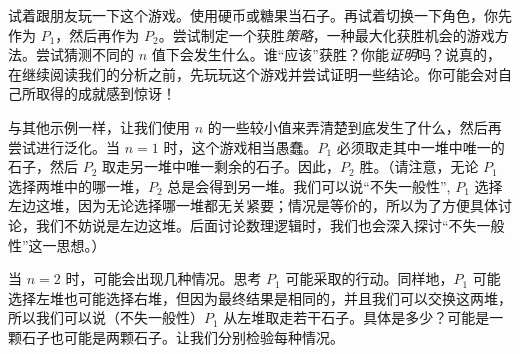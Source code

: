 试着跟朋友玩一下这个游戏。使用硬币或糖果当石子。再试着切换一下角色，你先作为 $P_1$，然后再作为 $P_2$。尝试制定一个获胜\textit{策略}，一种最大化获胜机会的游戏方法。尝试猜测不同的 $n$ 值下会发生什么。谁``应该''获胜？你能\textit{证明}吗？说真的，在继续阅读我们的分析之前，先玩玩这个游戏并尝试证明一些结论。你可能会对自己所取得的成就感到惊讶！

与其他示例一样，让我们使用 $n$ 的一些较小值来弄清楚到底发生了什么，然后再尝试进行泛化。当 $n = 1$ 时，这个游戏相当愚蠢。$P_1$ 必须取走其中一堆中唯一的石子，然后 $P_2$ 取走另一堆中唯一剩余的石子。因此，$P_2$ 胜。（请注意，无论 $P_1$ 选择两堆中的哪一堆，$P_2$ 总是会得到另一堆。我们可以说``不失一般性'', $P_1$ 选择左边这堆，因为无论选择哪一堆都无关紧要；情况是等价的，所以为了方便具体讨论，我们不妨说是左边这堆。后面讨论数理逻辑时，我们也会深入探讨``不失一般性''这一思想。）


\begin{center}
\end{center}

当 $n = 2$ 时，可能会出现几种情况。思考 $P_1$ 可能采取的行动。同样地，$P_1$ 可能选择左堆也可能选择右堆，但因为最终结果是相同的，并且我们可以交换这两堆，所以我们可以说（不失一般性）$P_1$ 从左堆取走若干石子。具体是多少？可能是一颗石子也可能是两颗石子。让我们分别检验每种情况。

